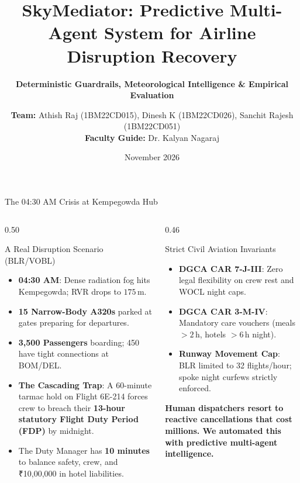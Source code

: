 \documentclass[aspectratio=169,10pt]{beamer}
\title[SkyMediator Disruption Recovery]{\textbf{\Large SkyMediator: Predictive Multi-Agent System for Airline Disruption Recovery}}
\subtitle{\textbf{Deterministic Guardrails, Meteorological Intelligence \& Empirical Evaluation}}
\author[Team SkyMediator]{\textbf{Team:} Athish Raj (1BM22CD015), Dinesh K (1BM22CD026), Sanchit Rajesh (1BM22CD051)\\[0.2em]
\textbf{Faculty Guide:} Dr. Kalyan Nagaraj}
\institute[BMSCE]{\textbf{Department of CSE (Data Science), B.M.S. College of Engineering, Bengaluru}\\Course: Agentic AI (26CD7PEAAI) \quad\textbar\quad Hub Airport: Kempegowda Intl (BLR/VOBL)}
\date{November 2026}
\begin{document}
\begin{frame}
  \titlepage
\end{frame}

\begin{frame}{The 04:30 AM Crisis at Kempegowda Hub}
  \begin{columns}[t]
    \begin{column}{0.50\textwidth}
      \begin{block}{A Real Disruption Scenario (BLR/VOBL)}
        \begin{itemize}\footnotesize
          \item \textbf{04:30 AM}: Dense radiation fog hits Kempegowda; RVR drops to $175\,$m.
          \item \textbf{15 Narrow-Body A320s} parked at gates preparing for departures.
          \item \textbf{3,500 Passengers} boarding; 450 have tight connections at BOM/DEL.
          \item \textbf{The Cascading Trap}: A 60-minute tarmac hold on Flight 6E-214 forces crew to breach their \textbf{13-hour statutory Flight Duty Period (FDP)} by midnight.
          \item The Duty Manager has \textbf{10 minutes} to balance safety, crew, and ₹10,00,000 in hotel liabilities.
        \end{itemize}
      \end{block}
    \end{column}
    \begin{column}{0.46\textwidth}
      \begin{block}{Strict Civil Aviation Invariants}
        \begin{itemize}\footnotesize
          \item \textbf{DGCA CAR 7-J-III}: Zero legal flexibility on crew rest and WOCL night caps.
          \item \textbf{DGCA CAR 3-M-IV}: Mandatory care vouchers (meals $>2\,$h, hotels $>6\,$h night).
          \item \textbf{Runway Movement Cap}: BLR limited to 32 flights/hour; spoke night curfews strictly enforced.
        \end{itemize}
      \end{block}
      \centering\footnotesize\color{NavyBlue}\textbf{Human dispatchers resort to reactive cancellations that cost millions. We automated this with predictive multi-agent intelligence.}
    \end{column}
  \end{columns}
\end{frame}
\end{document}
